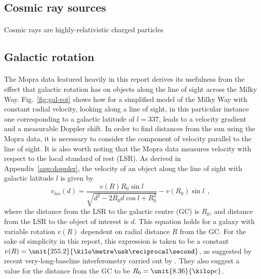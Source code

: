 \documentclass[a4paper, titlepage, oneside]{article}
\newcommand{\parsec}{\mathrm{pc}}
\begin{document}
\begin{multicols}{2}
\subsection{Cosmic ray sources}
\paragraph{}
Cosmic rays are highly-relativistic charged particles

\subsection{Galactic rotation}
\label{sec:gal-rot}
\paragraph{}
The Mopra data featured heavily in this report \parencite{Burton:2013} derives its usefulness from the effect that galactic rotation has on objects along the line of sight across the Milky Way. Fig.~\ref{fig:gal-rot} shows how for a simplified model of the Milky Way with constant radial velocity, looking along a line of sight, in this particular instance one corresponding to a galactic latitude of \(l=337\), leads to a velocity gradient and a measurable Doppler shift. In order to find distances from the sun using the Mopra data, it is necessary to consider the component of velocity parallel to the line of sight. It is also worth noting that the Mopra data measures velocity with respect to the local standard of rest (LSR). As derived in Appendix~\ref{app:doppler}, the velocity of an object along the line of sight with galactic latitude \(l\) is given by
\begin{equation}
  v_{los}(d)=\frac{v(R)R_0\sin{l}}{\sqrt{d^2-2R_0d\cos{l}+R_0^2}}-v(R_0)\sin{l}\;\,,
\end{equation}
where the distance from the LSR to the galactic centre (GC) is \(R_0\), and distance from the LSR to the object of interest is \(d\). This equation holds for a galaxy with variable rotation \(v(R)\) dependent on radial distance \(R\) from the GC. For the sake of simplicity in this report, this expression is taken to be a constant \(v(R)=\unit{255.2}{\kilo\metre\usk\reciprocal\second}\), as suggested by recent very-long-baseline interferometry carried out by \textcite{Reid:2014}. They also suggest a value for the distance from the GC to be \(R_0=\unit{8.36}{\kilo\parsec}\).


\end{multicols}
\end{document}
